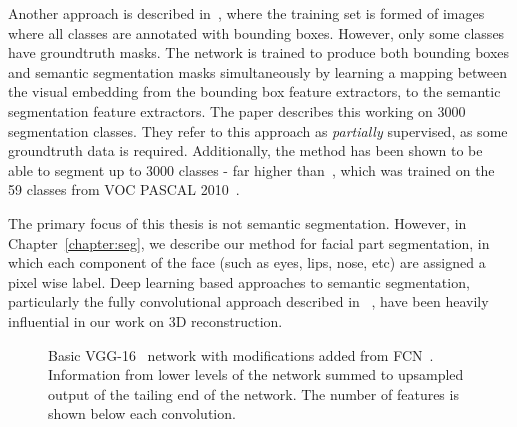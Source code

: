 Another approach is described in~\cite{hu2018learning}, where the
training set is formed of images where all classes are annotated with
bounding boxes. However, only some classes have groundtruth masks. The
network is trained to produce both bounding boxes and semantic
segmentation masks simultaneously by learning a mapping between the
visual embedding from the bounding box feature extractors, to the
semantic segmentation feature extractors. The paper describes this
working on 3000 segmentation classes. They refer to this approach as
\textit{partially} supervised, as some groundtruth data is
required. Additionally, the method has been shown to be able to
segment up to 3000 classes - far higher than~\cite{long2015fully},
which was trained on the 59 classes from VOC PASCAL
2010~\cite{everingham2010pascal}.

The primary focus of this thesis is not semantic
segmentation. However, in Chapter~\ref{chapter:seg}, we describe our
method for facial part segmentation, in which each component of the
face (such as eyes, lips, nose, etc) are assigned a pixel wise
label. Deep learning based approaches to semantic segmentation,
particularly the fully convolutional approach described in
~\cite{long2015fully}, have been heavily influential in our work on 3D
reconstruction.

\begin{figure}
  \centering
\caption[The VGG-16 network]{Basic VGG-16~\cite{simonyan2014vgg}
  network with modifications added from
  FCN~\cite{long2015fully}. Information from lower levels of the
  network summed to upsampled output of the tailing end of the
  network. The number of features is shown below each convolution.}
\label{fig:background:fcn}
\end{figure}

